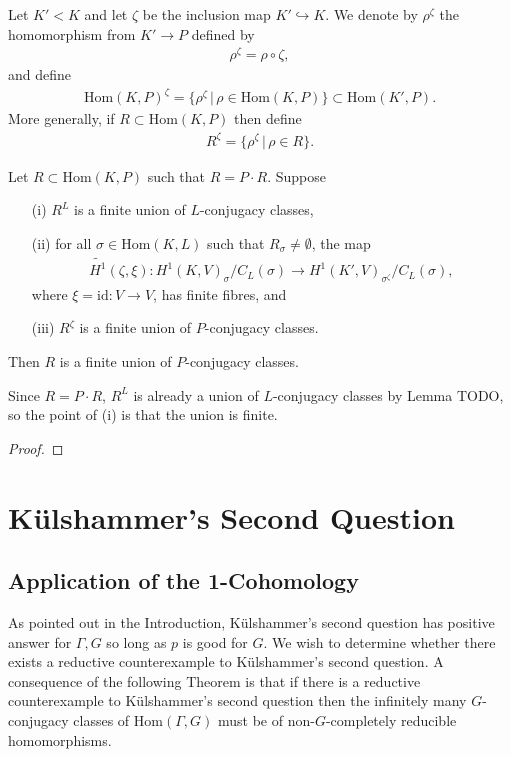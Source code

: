 \begin{definition} Let $K' < K$ and let $\zeta$ be the inclusion map $K' \hookrightarrow K$. We denote by $\rho^\zeta$ the homomorphism from $K' \rightarrow P$ defined by
	\begin{align*}
		\rho^\zeta = \rho \circ \zeta,
	\end{align*}
	and define
	\begin{align*}
		\mathrm{Hom}(K, P)^\zeta = \{ \rho^\zeta \,|\, \rho \in \mathrm{Hom}(K, P)\} \subset \mathrm{Hom}(K', P).
	\end{align*}
	More generally, if $R \subset \mathrm{Hom}(K, P)$ then define
	\begin{align*}
		R^\zeta = \{\rho^\zeta \,|\, \rho \in R\}.
	\end{align*}
\end{definition}

\begin{theorem} Let $R \subset \mathrm{Hom}(K, P)$ such that $R = P \cdot R$. Suppose
	\begin{itemize}
		\item[(i)] $R^L$ is a finite union of $L$-conjugacy classes,
		\item[(ii)] for all $\sigma \in \mathrm{Hom}(K, L)$ such that $R_\sigma \neq \emptyset$, the map
			\begin{align*}
				\widetilde{H^1}(\zeta, \xi):H^1(K, V)_\sigma/C_L(\sigma) \rightarrow H^1(K', V)_{\sigma^\zeta}/C_L(\sigma),
			\end{align*}
			where $\xi = \mathrm{id}:V \rightarrow V$, has finite fibres, and
		\item[(iii)] $R^\zeta$ is a finite union of $P$-conjugacy classes.
	\end{itemize}
	Then $R$ is a finite union of $P$-conjugacy classes.
\end{theorem}
\begin{remark}
	Since $R = P \cdot R$, $R^L$ is already a union of $L$-conjugacy classes by Lemma TODO, so the point of (i) is that the union is finite.
\end{remark}
\begin{proof}
\end{proof}

\section{K\"ulshammer's Second Question}
\subsection{Application of the 1-Cohomology}
As pointed out in the Introduction, K\"ulshammer's second question has positive answer for $\Gamma, G$ so long as $p$ is good for $G$. We wish to determine whether there exists a reductive counterexample to K\"ulshammer's second question.
A consequence of the following Theorem \cite[Theorem 1.2]{martin2003reductive} is that if there is a reductive counterexample to K\"ulshammer's second question then the infinitely many $G$-conjugacy classes of $\mathrm{Hom}(\Gamma, G)$ must be of non-$G$-completely reducible homomorphisms.

